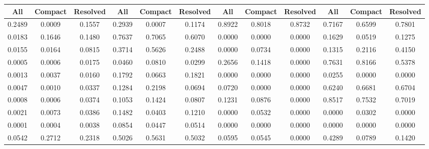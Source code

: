 \begin{table}
\begin{tabular}{cccccccccccc}
All & Compact & Resolved & All & Compact & Resolved & All & Compact & Resolved & All & Compact & Resolved \\
      \hline
0.2489 & 0.0009 & 0.1557 & 0.2939 & 0.0007 & 0.1174 & 0.8922 & 0.8018 & 0.8732 & 0.7167 & 0.6599 & 0.7801 \\
0.0183 & 0.1646 & 0.1480 & 0.7637 & 0.7065 & 0.6070 & 0.0000 & 0.0000 & 0.0000 & 0.1629 & 0.0519 & 0.1275 \\
0.0155 & 0.0164 & 0.0815 & 0.3714 & 0.5626 & 0.2488 & 0.0000 & 0.0734 & 0.0000 & 0.1315 & 0.2116 & 0.4150 \\
0.0005 & 0.0006 & 0.0175 & 0.0460 & 0.0810 & 0.0299 & 0.2656 & 0.1418 & 0.0000 & 0.7631 & 0.8166 & 0.5378 \\
0.0013 & 0.0037 & 0.0160 & 0.1792 & 0.0663 & 0.1821 & 0.0000 & 0.0000 & 0.0000 & 0.0255 & 0.0000 & 0.0000 \\
0.0047 & 0.0010 & 0.0337 & 0.1284 & 0.2198 & 0.0694 & 0.0720 & 0.0000 & 0.0000 & 0.6240 & 0.6681 & 0.6704 \\
0.0008 & 0.0006 & 0.0374 & 0.1053 & 0.1424 & 0.0807 & 0.1231 & 0.0876 & 0.0000 & 0.8517 & 0.7532 & 0.7019 \\
0.0021 & 0.0073 & 0.0386 & 0.1482 & 0.0403 & 0.1210 & 0.0000 & 0.0532 & 0.0000 & 0.0000 & 0.0302 & 0.0000 \\
0.0001 & 0.0004 & 0.0038 & 0.0854 & 0.0447 & 0.0514 & 0.0000 & 0.0000 & 0.0000 & 0.0000 & 0.0000 & 0.0000 \\
0.0542 & 0.2712 & 0.2318 & 0.5026 & 0.5631 & 0.5032 & 0.0595 & 0.0545 & 0.0000 & 0.4289 & 0.0789 & 0.1420 \\
      \hline\hline
    \end{tabular}
  \end{table}

